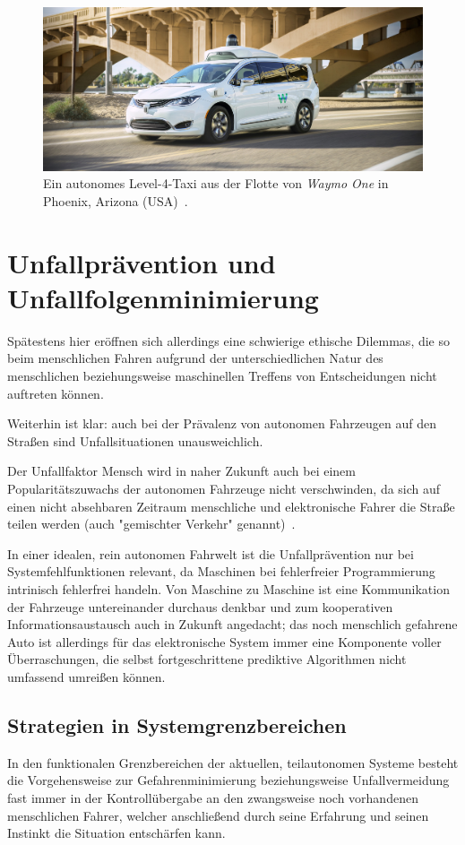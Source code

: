 \documentclass[twocolumn, german]{tum-article}
\begin{document}
\begin{figure}
	\includegraphics[width=\linewidth]{media/waymo-one.jpg}
	\caption{Ein autonomes Level-4-Taxi aus der Flotte von \emph{Waymo One} in Phoenix, Arizona (USA)~\cite{waymo-img}.}
\end{figure}


\section{Unfallprävention und Unfallfolgenminimierung}
Spätestens hier eröffnen sich allerdings eine schwierige ethische Dilemmas, die so beim menschlichen Fahren aufgrund der unterschiedlichen Natur des menschlichen beziehungsweise maschinellen Treffens von Entscheidungen nicht auftreten können.

Weiterhin ist klar: auch bei der Prävalenz von autonomen Fahrzeugen auf den Straßen sind Unfallsituationen unausweichlich.

Der Unfallfaktor Mensch wird in naher Zukunft auch bei einem Popularitätszuwachs der autonomen Fahrzeuge nicht verschwinden, da sich auf einen nicht absehbaren Zeitraum menschliche und elektronische Fahrer die Straße teilen werden (auch "gemischter Verkehr" genannt)~\cite[S. 1278]{nyholm-ethics}.

In einer idealen, rein autonomen Fahrwelt ist die Unfallprävention nur bei Systemfehlfunktionen relevant, da Maschinen bei fehlerfreier Programmierung intrinisch fehlerfrei handeln.
Von Maschine zu Maschine ist eine Kommunikation der Fahrzeuge untereinander durchaus denkbar und zum kooperativen Informationsaustausch auch in Zukunft angedacht; das noch menschlich gefahrene Auto ist allerdings für das elektronische System immer eine Komponente voller Überraschungen, die selbst fortgeschrittene prediktive Algorithmen nicht umfassend umreißen können.


\subsection{Strategien in Systemgrenzbereichen}
In den funktionalen Grenzbereichen der aktuellen, teilautonomen Systeme besteht die Vorgehensweise zur Gefahrenminimierung beziehungsweise Unfallvermeidung fast immer in der Kontrollübergabe an den zwangsweise noch vorhandenen menschlichen Fahrer, welcher anschließend durch seine Erfahrung und seinen Instinkt die Situation entschärfen kann.
\end{document}
